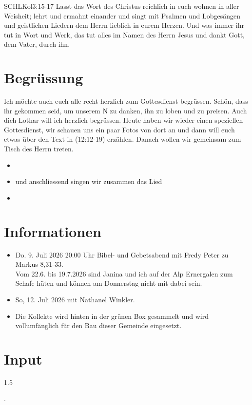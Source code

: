\documentclass[fontsize=14pt]{mybib}
\author{OTS}
\newcommand{\Name}{Lothar}
\begin{document}
\begin{bibelbox}{SCHL}{Kol}{3:15-17}
    Lasst das Wort des Christus reichlich in euch wohnen in aller Weisheit; lehrt und ermahnt einander und singt mit Psalmen und Lobgesängen und geistlichen Liedern dem Herrn lieblich in eurem Herzen. Und was immer ihr tut in Wort und Werk, das tut alles im Namen des Herrn Jesus und dankt Gott, dem Vater, durch ihn.
\end{bibelbox}
\section{Begrüssung}
Ich möchte auch euch alle recht herzlich zum Gottesdienst begrüssen. Schön, dass ihr gekommen seid, um unserem \herr N zu danken, ihn zu loben und zu preisen. 
Auch dich \Name{} will ich herzlich begrüssen. 
Heute haben wir wieder einen speziellen Gottesdienst, wir schauen uns ein paar Fotos von dort an und dann will euch etwas über den Text in (12:12-19) erzählen. Danach wollen wir gemeinsam zum Tisch des Herrn treten.
\begin{itemize}
    \item[] 
    \item[] und anschliessend singen wir zusammen das Lied
    \item[] 
\end{itemize}
\section{Informationen}
\begin{itemize}
    \item {} Do. 9. Juli 2026 20:00 Uhr Bibel- und Gebetsabend mit Fredy Peter zu Markus 8,31-33.\\
    Vom 22.6. bis 19.7.2026 sind Janina und ich auf der Alp Ernergalen zum Schafe hüten und können am Donnerstag nicht mit dabei sein.
    \item {} So, 12. Juli 2026 mit Nathanel Winkler.
    \item {} Die Kollekte wird hinten in der grünen Box gesammelt und wird vollumfänglich für den Bau dieser Gemeinde eingesetzt.
\end{itemize}
\section{Input}
\begin{spacing}{1.5}
    
    .
\end{spacing}
\end{document}
